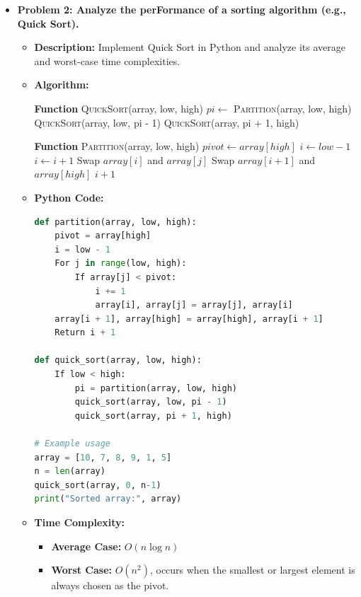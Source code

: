 \documentclass[12pt]{book} %
\begin{document}
\begin{itemize}
    \item \textbf{Problem 2: Analyze the perFormance of a sorting algorithm (e.g., Quick Sort).}
    \begin{itemize}
        \item \textbf{Description:} Implement Quick Sort in Python and analyze its average and worst-case time complexities.
        \item \textbf{Algorithm:}
        \begin{algorithm}
        \caption{Quick Sort}
        \begin{algorithmic}
            \State \textbf{Function} \textsc{QuickSort}(array, low, high)
                \State $pi \leftarrow$ \textsc{Partition}(array, low, high)
                \State \textsc{QuickSort}(array, low, pi - 1)
                \State \textsc{QuickSort}(array, pi + 1, high)
            \EndIf
        \end{algorithmic}
        \end{algorithm}
        \begin{algorithm}
        \caption{Partition}
        \begin{algorithmic}
            \State \textbf{Function} \textsc{Partition}(array, low, high)
            \State $pivot \leftarrow array[high]$
            \State $i \leftarrow low - 1$
                    \State $i \leftarrow i + 1$
                    \State Swap $array[i]$ and $array[j]$
                \EndIf
            \EndFor
            \State Swap $array[i + 1]$ and $array[high]$
            \Return $i + 1$
        \end{algorithmic}
        \end{algorithm}
        \item \textbf{Python Code:}
        \FloatBarrier
        \begin{lstlisting}[language=Python]
def partition(array, low, high):
    pivot = array[high]
    i = low - 1
    For j in range(low, high):
        If array[j] < pivot:
            i += 1
            array[i], array[j] = array[j], array[i]
    array[i + 1], array[high] = array[high], array[i + 1]
    Return i + 1

def quick_sort(array, low, high):
    If low < high:
        pi = partition(array, low, high)
        quick_sort(array, low, pi - 1)
        quick_sort(array, pi + 1, high)

# Example usage
array = [10, 7, 8, 9, 1, 5]
n = len(array)
quick_sort(array, 0, n-1)
print("Sorted array:", array)
        \end{lstlisting}
        \FloatBarrier
        \item \textbf{Time Complexity:}
        \begin{itemize}
            \item \textbf{Average Case:} $O(n \log n)$
            \item \textbf{Worst Case:} $O(n^2)$, occurs when the smallest or largest element is always chosen as the pivot.
        \end{itemize}
    \end{itemize}


\end{itemize}
\end{document}
